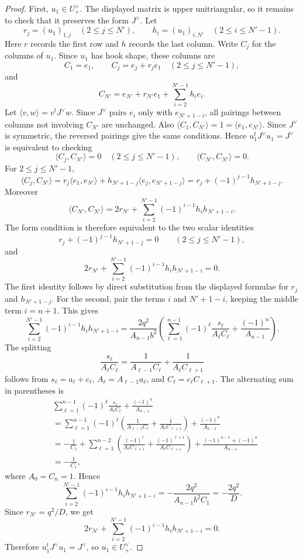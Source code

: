 \documentclass{article}
\begin{document}
\begin{proof}
First, \(u_1\in U_+^\vee\). The displayed matrix is upper unitriangular, so it remains to check that it preserves the form \(J^\vee\). Let
\[
r_j=(u_1)_{1,j}\quad(2\le j\le N'),
\qquad
h_i=(u_1)_{i,N'}\quad(2\le i\le N'-1).
\]
Here \(r\) records the first row and \(h\) records the last column. Write \(C_j\) for the columns of \(u_1\). Since \(u_1\) has hook shape, these columns are
\[
C_1=e_1,\qquad
C_j=e_j+r_je_1\quad(2\le j\le N'-1),
\]
and
\[
C_{N'}=e_{N'}+r_{N'}e_1+\sum_{i=2}^{N'-1}h_ie_i.
\]
Let \(\langle v,w\rangle=v^tJ^\vee w\). Since \(J^\vee\) pairs \(e_i\) only with \(e_{N'+1-i}\), all pairings between columns not involving \(C_{N'}\) are unchanged. Also \(\langle C_1,C_{N'}\rangle=1=\langle e_1,e_{N'}\rangle\). Since \(J^\vee\) is symmetric, the reversed pairings give the same conditions. Hence \(u_1^tJ^\vee u_1=J^\vee\) is equivalent to checking
\[
\langle C_j,C_{N'}\rangle=0\quad(2\le j\le N'-1),
\qquad
\langle C_{N'},C_{N'}\rangle=0.
\]
For \(2\le j\le N'-1\),
\[
\langle C_j,C_{N'}\rangle
=r_j\langle e_1,e_{N'}\rangle
+h_{N'+1-j}\langle e_j,e_{N'+1-j}\rangle
=r_j+(-1)^{j-1}h_{N'+1-j}.
\]
Moreover
\[
\langle C_{N'},C_{N'}\rangle
=2r_{N'}+\sum_{i=2}^{N'-1}(-1)^{i-1}h_ih_{N'+1-i}.
\]
The form condition is therefore equivalent to the two scalar identities
\[
r_j+(-1)^{j-1}h_{N'+1-j}=0
\qquad(2\le j\le N'-1),
\]
and
\[
2r_{N'}+\sum_{i=2}^{N'-1}(-1)^{i-1}h_ih_{N'+1-i}=0.
\]
The first identity follows by direct substitution from the displayed formulae for \(r_j\) and \(h_{N'+1-j}\). For the second, pair the terms \(i\) and \(N'+1-i\), keeping the middle term \(i=n+1\). This gives
\[
\sum_{i=2}^{N'-1}(-1)^{i-1}h_ih_{N'+1-i}
=
\frac{2q^2}{A_{n-1}b^2}
\left(
\sum_{\ell=1}^{n-1}(-1)^\ell\frac{s_\ell}{A_\ell C_\ell}
+\frac{(-1)^n}{A_{n-1}}
\right).
\]
The splitting
\[
\frac{s_\ell}{A_\ell C_\ell}
=
\frac{1}{A_{\ell-1}C_\ell}
+
\frac{1}{A_\ell C_{\ell+1}}
\]
follows from \(s_\ell=a_\ell+c_\ell\), \(A_\ell=A_{\ell-1}a_\ell\), and \(C_\ell=c_\ell C_{\ell+1}\). The alternating sum in parentheses is
\[
\begin{aligned}
&\sum_{\ell=1}^{n-1}(-1)^\ell\frac{s_\ell}{A_\ell C_\ell}
+\frac{(-1)^n}{A_{n-1}}\\
&=
\sum_{\ell=1}^{n-1}(-1)^\ell
\left(
\frac{1}{A_{\ell-1}C_\ell}
+
\frac{1}{A_\ell C_{\ell+1}}
\right)
+\frac{(-1)^n}{A_{n-1}}\\
&=
-\frac{1}{C_1}
+\sum_{\ell=1}^{n-2}
\left(
\frac{(-1)^\ell}{A_\ell C_{\ell+1}}
+
\frac{(-1)^{\ell+1}}{A_\ell C_{\ell+1}}
\right)
+\frac{(-1)^{n-1}+(-1)^n}{A_{n-1}}\\
&=-\frac{1}{C_1},
\end{aligned}
\]
where \(A_0=C_n=1\). Hence
\[
\sum_{i=2}^{N'-1}(-1)^{i-1}h_ih_{N'+1-i}
=
-\frac{2q^2}{A_{n-1}b^2C_1}
=-\frac{2q^2}{D}.
\]
Since \(r_{N'}=q^2/D\), we get
\[
2r_{N'}+\sum_{i=2}^{N'-1}(-1)^{i-1}h_ih_{N'+1-i}=0.
\]
Therefore \(u_1^tJ^\vee u_1=J^\vee\), so \(u_1\in U_+^\vee\).


\end{proof}
\end{document}
